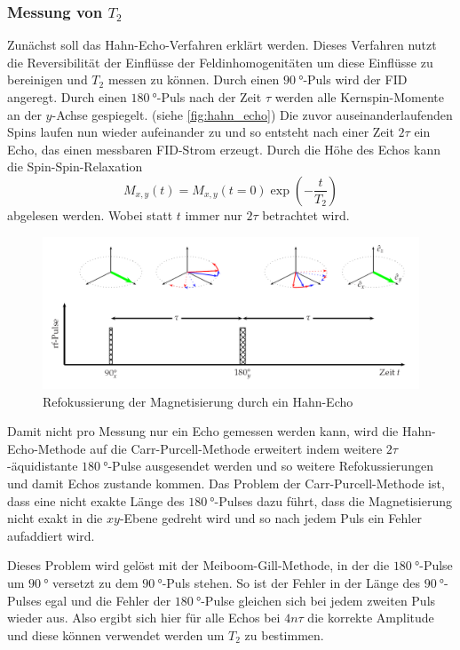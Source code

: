 \subsubsection{Messung von \texorpdfstring{$T_2$}{T2}}
\label{sssec:T2_Messung}

Zunächst soll das Hahn-Echo-Verfahren erklärt werden.
Dieses Verfahren nutzt die Reversibilität der Einflüsse der Feldinhomogenitäten um diese Einflüsse zu bereinigen und $T_2$ messen zu können.
Durch einen $\SI{90}{\degree}$-Puls wird der FID angeregt.
Durch einen $\SI{180}{\degree}$-Puls nach der Zeit $\tau$ werden alle Kernspin-Momente an der $y$-Achse gespiegelt. (siehe \autoref{fig:hahn_echo})
Die zuvor auseinanderlaufenden Spins laufen nun wieder aufeinander zu und so entsteht nach einer Zeit $2\tau$ ein Echo, das einen messbaren FID-Strom erzeugt.
Durch die Höhe des Echos kann die Spin-Spin-Relaxation 
\begin{equation}
    M_{x,y}(t) = M_{x,y}(t=0) \exp\left(-\frac{t}{T_2}\right)
    \label{eq:T2_relaxation}
\end{equation}
abgelesen werden. Wobei statt $t$ immer nur $2\tau$ betrachtet wird.

\begin{figure}
    \centering
    \includegraphics[width=\textwidth]{images/hahn_echo_2.png}
    \caption{Refokussierung der Magnetisierung durch ein Hahn-Echo \cite{V49}}
    \label{fig:hahn_echo}
\end{figure}

Damit nicht pro Messung nur ein Echo gemessen werden kann, wird die Hahn-Echo-Methode auf die Carr-Purcell-Methode erweitert
indem weitere $2\tau$-äquidistante $\SI{180}{\degree}$-Pulse ausgesendet werden 
und so weitere Refokussierungen und damit Echos zustande kommen.
Das Problem der Carr-Purcell-Methode ist, dass eine nicht exakte Länge des $\SI{180}{\degree}$-Pulses
dazu führt, dass die Magnetisierung nicht exakt in die $xy$-Ebene gedreht wird und so nach jedem Puls ein Fehler aufaddiert wird.

Dieses Problem wird gelöst mit der Meiboom-Gill-Methode, in der die $\SI{180}{\degree}$-Pulse um $\SI{90}{\degree}$ versetzt zu dem $\SI{90}{\degree}$-Puls stehen.
So ist der Fehler in der Länge des $\SI{90}{\degree}$-Pulses egal und die Fehler der $\SI{180}{\degree}$-Pulse gleichen sich bei jedem zweiten Puls wieder aus.
Also ergibt sich hier für alle Echos bei $4n\tau$ die korrekte Amplitude und diese können verwendet werden um $T_2$ zu bestimmen.

